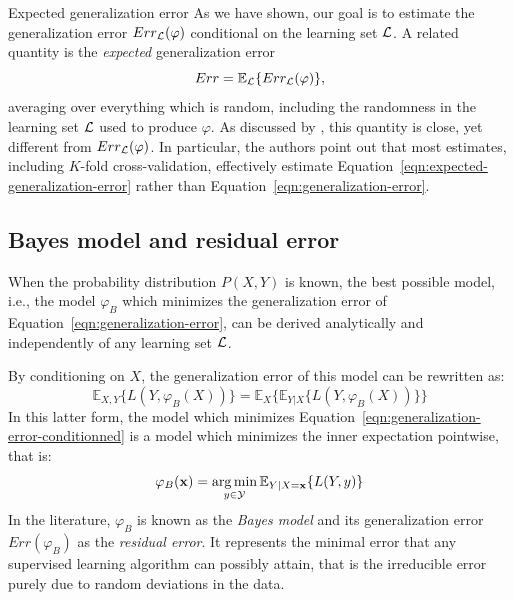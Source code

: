 \begin{remark}{Expected generalization error}
As we have shown, our goal is to estimate the generalization error $Err_{\cal
L}(\varphi)$ conditional on the learning set ${\cal L}$. A related quantity
is the \textit{expected} generalization error
\begin{equation}\label{eqn:expected-generalization-error}
Err = \mathbb{E}_{\cal L} \{ Err_{\cal L}(\varphi) \},
\end{equation}
averaging over everything which is random, including the randomness in the
learning set ${\cal L}$ used to produce $\varphi$. As discussed by
\citet{hastie:2005}, this quantity is close, yet different from $Err_{\cal
L}(\varphi)$. In particular, the authors point out that most estimates, including $K$-fold
cross-validation, effectively estimate
Equation~\ref{eqn:expected-generalization-error} rather than
Equation~\ref{eqn:generalization-error}.
\end{remark}

\subsection{Bayes model and residual error}
\label{sec:2:bayes-model}

When the probability distribution $P(X, Y)$ is known, the best possible model,
i.e., the model $\varphi_B$ which minimizes the generalization error of
Equation~\ref{eqn:generalization-error}, can be derived analytically and
independently of any learning set ${\cal L}$.

By conditioning on $X$, the generalization error of this model can be rewritten as:
\begin{equation}\label{eqn:generalization-error-conditionned}
\mathbb{E}_{X, Y}\{ L(Y, \varphi_B(X)) \} = \mathbb{E}_{X}\{ \mathbb{E}_{Y|X} \{ L(Y, \varphi_B(X)) \} \}
\end{equation}
In this latter form, the model which minimizes
Equation~\ref{eqn:generalization-error-conditionned} is a model which
minimizes the inner expectation pointwise, that is:
\begin{equation}
\varphi_B(\mathbf{x}) = \operatorname*{arg\,min}_{y \in {\cal Y}} \mathbb{E}_{Y|X=\mathbf{x}} \{ L(Y, y) \}
\end{equation}
In the literature, $\varphi_B$ is known as the \textit{Bayes model} and its
generalization error $Err(\varphi_B)$ as the \textit{residual error}. It represents the minimal
error that any supervised learning algorithm can possibly attain, that is
the irreducible error purely due to random deviations in the data.

